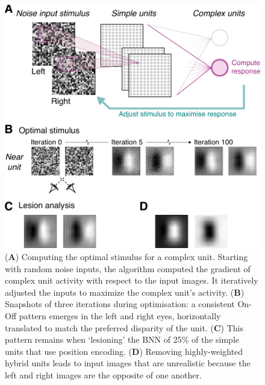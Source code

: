 {\begin{figure}[!h]
  \centering
  \includegraphics{chapter1/chapter1-figs/Fig4.pdf}
  \caption[Optimal stimuli for the binocular neural network.]{({\bf A}) Computing the optimal stimulus for a complex unit. Starting with random noise inputs, the algorithm computed the gradient of complex unit activity with respect to the input images. It iteratively adjusted the inputs to maximize the complex unit's activity. ({\bf B}) Snapshots of three iterations during optimisation: a consistent On-Off pattern emerges in the left and right eyes, horizontally translated to match the preferred disparity of the unit. ({\bf C}) This pattern remains when `lesioning' the BNN of 25\% of the simple units that use position encoding. ({\bf D}) Removing highly-weighted hybrid units leads to input images that are unrealistic because the left and right images are the opposite of one another.}
  \label{fig:c1f4}
\end{figure}


}
